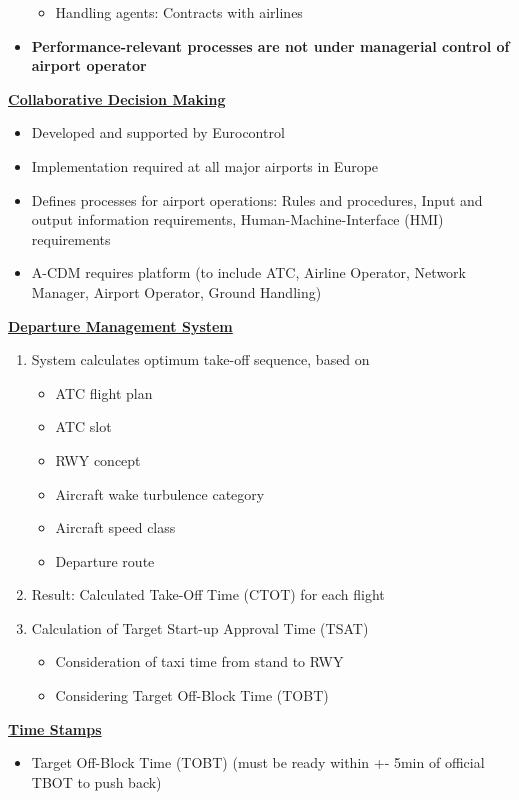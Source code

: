 \documentclass[9pt, landscape, fleqn]{scrartcl}
\begin{document}
\begin{multicols*}{3}
\begin{itemize}
\begin{itemize}
        \item Handling agents: Contracts with airlines 
    \end{itemize}
    \item \textbf{Performance-relevant processes are not under managerial control of airport operator}
\end{itemize}
\underline{\textbf{Collaborative Decision Making}}
\begin{itemize}
    \item Developed and supported by Eurocontrol
    \item Implementation required at all major airports in Europe 
    \item Defines processes for airport operations: Rules and procedures, Input and output information requirements, Human-Machine-Interface (HMI) requirements 
    \item A-CDM requires platform (to include ATC, Airline Operator, Network Manager, Airport Operator, Ground Handling)
\end{itemize}
\underline{\textbf{Departure Management System}}
\begin{enumerate}
    \item System calculates optimum take-off sequence, based on 
    \begin{itemize}
        \item ATC flight plan 
        \item ATC slot 
        \item RWY concept 
        \item Aircraft wake turbulence category
        \item Aircraft speed class 
        \item Departure route 
    \end{itemize}
    \item Result: Calculated Take-Off Time (CTOT) for each flight 
    \item Calculation of Target Start-up Approval Time (TSAT)
    \begin{itemize}
        \item Consideration of taxi time from stand to RWY 
        \item Considering Target Off-Block Time (TOBT)
    \end{itemize} 
\end{enumerate}
\underline{\textbf{Time Stamps}}
\begin{itemize}
    \item Target Off-Block Time (TOBT) (must be ready within +- 5min of official TBOT to push back)

\end{itemize}
\end{multicols*}
\end{document}
